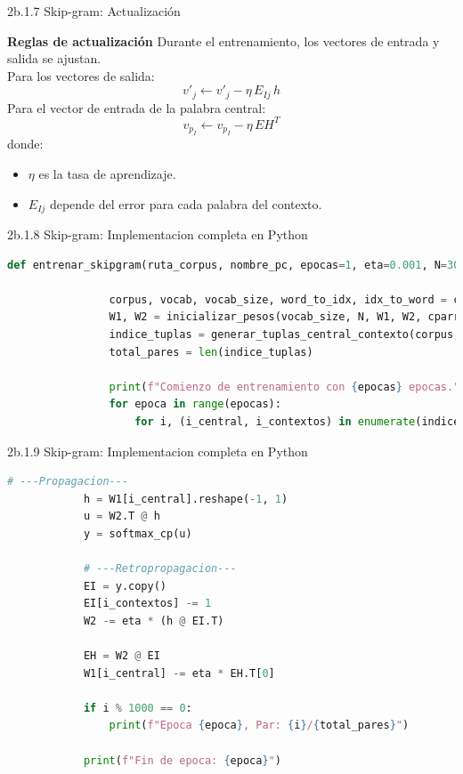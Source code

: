 \documentclass{beamer}
\begin{document}
\begin{frame}[fragile]{2b.1.7 Skip-gram: Actualización}
	\begin{block}{\textbf{Reglas de actualización}}
		\justifying
		Durante el entrenamiento, los vectores de entrada y salida se ajustan.\\
		\vspace{0.2cm}
		Para los vectores de salida:
		\[
		v'_j \leftarrow v'_j - \eta \, E_{Ij} \, h
		\]
		Para el vector de entrada de la palabra central:
		\[
		v_{p_I} \leftarrow v_{p_I} - \eta \, EH^T
		\]
		donde:
		\begin{itemize}
			\item $\eta$ es la tasa de aprendizaje.
			\item $E_{Ij}$ depende del error para cada palabra del contexto.
		\end{itemize}
	\end{block}
	
\end{frame}

\begin{frame}[fragile]{2b.1.8 Skip-gram: Implementacion completa en Python}
	
	\begin{block}{}
		\begin{lstlisting}[language=Python]
			def entrenar_skipgram(ruta_corpus, nombre_pc, epocas=1, eta=0.001, N=300, C=4, W1=None, W2=None, intervalo_guardado=50):
			
				corpus, vocab, vocab_size, word_to_idx, idx_to_word = cargar_corpus(ruta_corpus)
				W1, W2 = inicializar_pesos(vocab_size, N, W1, W2, cparray=True)
				indice_tuplas = generar_tuplas_central_contexto(corpus, word_to_idx, C)
				total_pares = len(indice_tuplas)
				
				print(f"Comienzo de entrenamiento con {epocas} epocas.")
				for epoca in range(epocas):
					for i, (i_central, i_contextos) in enumerate(indice_tuplas):              
		\end{lstlisting}
	\end{block}
\end{frame}

\begin{frame}[fragile]{2b.1.9 Skip-gram: Implementacion completa en Python}
	
	\begin{block}{}
		\begin{lstlisting}[language=Python]
			# ---Propagacion---
			h = W1[i_central].reshape(-1, 1)
			u = W2.T @ h
			y = softmax_cp(u)
			
			# ---Retropropagacion---
			EI = y.copy()
			EI[i_contextos] -= 1
			W2 -= eta * (h @ EI.T)
			
			EH = W2 @ EI
			W1[i_central] -= eta * EH.T[0]
			
			if i % 1000 == 0:
				print(f"Epoca {epoca}, Par: {i}/{total_pares}")
			
			print(f"Fin de epoca: {epoca}")                
		\end{lstlisting}
	\end{block}
\end{frame}
\end{document}
